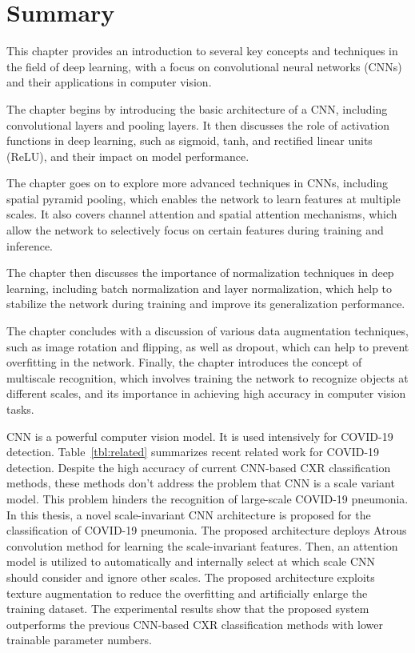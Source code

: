 

\section{Summary}
This chapter provides an introduction to several key concepts and techniques in the field of deep learning, with a focus on convolutional neural networks (CNNs) and their applications in computer vision.

The chapter begins by introducing the basic architecture of a CNN, including convolutional layers and pooling layers. It then discusses the role of activation functions in deep learning, such as sigmoid, tanh, and rectified linear units (ReLU), and their impact on model performance.

The chapter goes on to explore more advanced techniques in CNNs, including spatial pyramid pooling, which enables the network to learn features at multiple scales. It also covers channel attention and spatial attention mechanisms, which allow the network to selectively focus on certain features during training and inference.

The chapter then discusses the importance of normalization techniques in deep learning, including batch normalization and layer normalization, which help to stabilize the network during training and improve its generalization performance.

The chapter concludes with a discussion of various data augmentation techniques, such as image rotation and flipping, as well as dropout, which can help to prevent overfitting in the network. Finally, the chapter introduces the concept of multiscale recognition, which involves training the network to recognize objects at different scales, and its importance in achieving high accuracy in computer vision tasks.


CNN is a powerful computer vision model. It is used intensively for COVID-19 detection. Table~\ref{tbl:related} summarizes recent related work for COVID-19 detection. Despite the high accuracy of current CNN-based CXR classification methods, these methods don't address the problem that CNN is a scale variant model. This problem hinders the recognition of large-scale COVID-19 pneumonia. In this thesis, a novel scale-invariant CNN architecture is proposed for the classification of COVID-19 pneumonia. The proposed architecture deploys Atrous convolution method for learning the scale-invariant features. Then, an attention model is utilized to automatically and internally select at which scale  CNN should consider and ignore other scales. The proposed architecture exploits texture augmentation to reduce the overfitting and artificially enlarge the training dataset. The experimental results show that the proposed system outperforms the previous CNN-based CXR classification methods with lower trainable parameter numbers.

